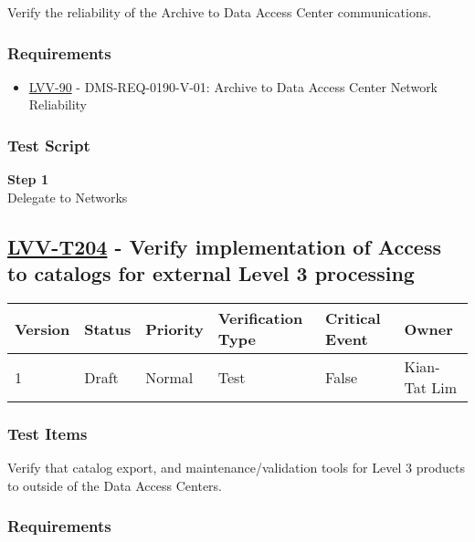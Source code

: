 Verify the reliability of the Archive to Data Access Center
communications.

\subsubsection{Requirements}\label{requirements-61}

\begin{itemize}
\tightlist
\item
  \href{https://jira.lsstcorp.org/browse/LVV-90}{LVV-90} -
  DMS-REQ-0190-V-01: Archive to Data Access Center Network Reliability
\end{itemize}

\subsubsection{Test Script}\label{test-script-61}

\textbf{Step 1}\\
Delegate to Networks\\[2\baselineskip]

\hypertarget{lvv-t204---verify-implementation-of-access-to-catalogs-for-external-level-3-processing}{\subsection{\texorpdfstring{\href{https://jira.lsstcorp.org/secure/Tests.jspa\#/testCase/LVV-T204}{LVV-T204}
- Verify implementation of Access to catalogs for external Level 3
processing}{LVV-T204 - Verify implementation of Access to catalogs for external Level 3 processing}}\label{lvv-t204---verify-implementation-of-access-to-catalogs-for-external-level-3-processing}}

\begin{longtable}[]{@{}llllll@{}}
\toprule
Version & Status & Priority & Verification Type & Critical Event &
Owner\tabularnewline
\midrule
\endhead
1 & Draft & Normal & Test & False & Kian-Tat Lim\tabularnewline
\bottomrule
\end{longtable}

\subsubsection{Test Items}\label{test-items-61}

Verify that catalog export, and maintenance/validation tools for Level 3
products to outside of the Data Access Centers.

\subsubsection{Requirements}\label{requirements-62}


